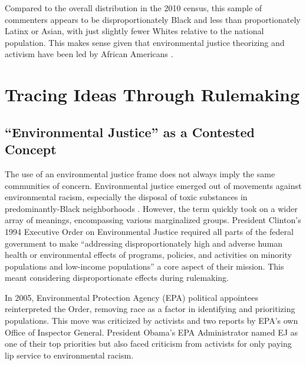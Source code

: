\documentclass[
      12pt,
        ]{article}
\begin{document}
Compared to the overall distribution in the 2010 census, this sample of commenters
appears to be disproportionately Black and less than proportionately
Latinx or Asian, with just slightly fewer Whites relative to the
national population. This makes sense given that environmental justice
theorizing and activism have been led by African Americans
\citep{Bullard1993}.

\hypertarget{tracing-ideas-through-rulemaking}{%
\section{Tracing Ideas Through Rulemaking}\label{tracing-ideas-through-rulemaking}}

\hypertarget{environmental-justice-as-a-contested-concept}{%
\subsection{``Environmental Justice'' as a Contested Concept}\label{environmental-justice-as-a-contested-concept}}

The use of an environmental justice frame does not always imply the same
communities of concern. Environmental justice emerged out of movements
against environmental racism, especially the disposal of toxic
substances in predominantly-Black neighborhoods \citep{Bullard1993}. However, the term
quickly took on a wider array of meanings, encompassing various marginalized groups. President Clinton's 1994 Executive Order on
Environmental Justice required all parts of the federal government
to make ``addressing disproportionately high and adverse human health or
environmental effects of programs, policies, and activities on minority
populations and low-income populations'' a core aspect of their mission.
This meant considering disproportionate effects during rulemaking.

In 2005, Environmental Protection Agency (EPA) political appointees reinterpreted the Order, removing race as a factor in identifying and prioritizing populations. This move was criticized by activists and two reports by EPA's own Office of Inspector General. President Obama's EPA Administrator named EJ as one of their top priorities but also faced criticism from activists for only paying lip service to environmental racism.
\end{document}
